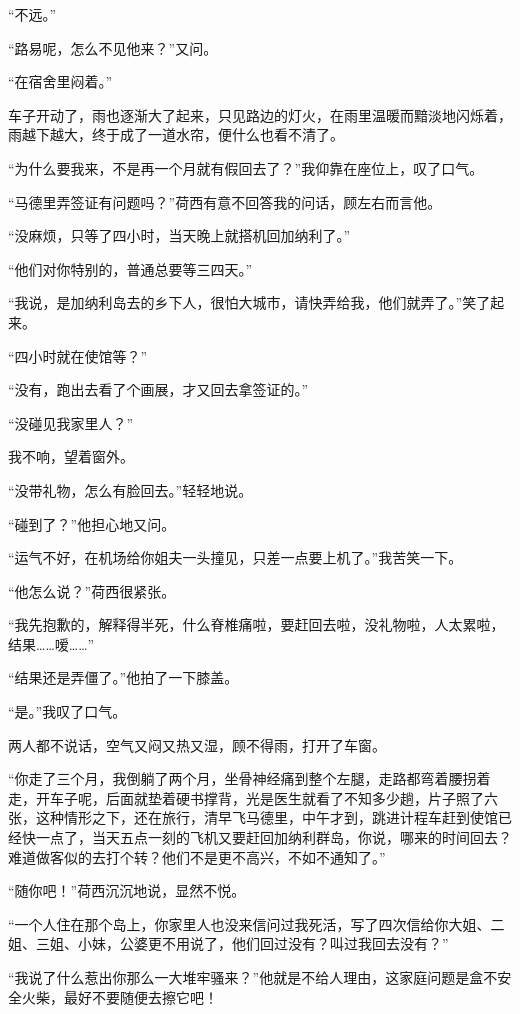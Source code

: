 \par “不远。”
\par “路易呢，怎么不见他来？”又问。
\par “在宿舍里闷着。”
\par 车子开动了，雨也逐渐大了起来，只见路边的灯火，在雨里温暖而黯淡地闪烁着，雨越下越大，终于成了一道水帘，便什么也看不清了。
\par “为什么要我来，不是再一个月就有假回去了？”我仰靠在座位上，叹了口气。
\par “马德里弄签证有问题吗？”荷西有意不回答我的问话，顾左右而言他。
\par “没麻烦，只等了四小时，当天晚上就搭机回加纳利了。”
\par “他们对你特别的，普通总要等三四天。”
\par “我说，是加纳利岛去的乡下人，很怕大城市，请快弄给我，他们就弄了。”笑了起来。
\par “四小时就在使馆等？”
\par “没有，跑出去看了个画展，才又回去拿签证的。”
\par “没碰见我家里人？”
\par 我不响，望着窗外。
\par “没带礼物，怎么有脸回去。”轻轻地说。
\par “碰到了？”他担心地又问。
\par “运气不好，在机场给你姐夫一头撞见，只差一点要上机了。”我苦笑一下。
\par “他怎么说？”荷西很紧张。
\par “我先抱歉的，解释得半死，什么脊椎痛啦，要赶回去啦，没礼物啦，人太累啦，结果……嗳……”
\par “结果还是弄僵了。”他拍了一下膝盖。
\par “是。”我叹了口气。
\par 两人都不说话，空气又闷又热又湿，顾不得雨，打开了车窗。
\par “你走了三个月，我倒躺了两个月，坐骨神经痛到整个左腿，走路都弯着腰拐着走，开车子呢，后面就垫着硬书撑背，光是医生就看了不知多少趟，片子照了六张，这种情形之下，还在旅行，清早飞马德里，中午才到，跳进计程车赶到使馆已经快一点了，当天五点一刻的飞机又要赶回加纳利群岛，你说，哪来的时间回去？难道做客似的去打个转？他们不是更不高兴，不如不通知了。”
\par “随你吧！”荷西沉沉地说，显然不悦。
\par “一个人住在那个岛上，你家里人也没来信问过我死活，写了四次信给你大姐、二姐、三姐、小妹，公婆更不用说了，他们回过没有？叫过我回去没有？”
\par “我说了什么惹出你那么一大堆牢骚来？”他就是不给人理由，这家庭问题是盒不安全火柴，最好不要随便去擦它吧！
